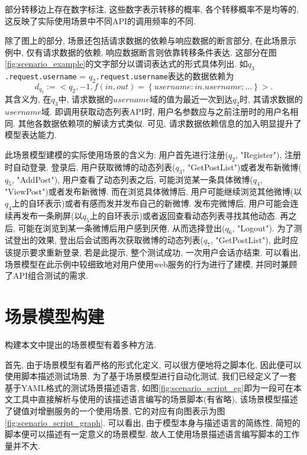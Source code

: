         部分转移边上存在数字标注, 这些数字表示转移的概率, 各个转移概率不是均等的, 这反映了实际使用场景中不同API的调用频率的不同.
        
        除了图上的部分, 场景还包括请求数据的依赖与响应数据的断言部分, 在此场景示例中, 仅有请求数据的依赖, 响应数据断言则依靠转移条件表达. 这部分在图\ref{fig:scenario_example}的文字部分以谓词表达式的形式具体列出. 如$q_3$\texttt{.request.username} = $q_2$\texttt{.request.username}表达的数据依赖为
        \begin{equation}
            d_{q_3} := <q_2, -1, f(in, out) = \left\{username: in.username;\dots\right\}>.
        \end{equation}
        其含义为, 在$q_3$中, 请求数据的$username$域的值为最近一次到达$q_2$时, 其请求数据的$username$域. 即调用获取动态列表API时, 用户名参数应与之前注册时的用户名相同. 其他各数据依赖项的解读方式类似. 可见, 请求数据依赖信息的加入明显提升了模型表达能力.
        
        此场景模型建模的实际使用场景的含义为: 用户首先进行注册($q_2$, "Register"), 注册时自动登录. 登录后, 用户获取微博的动态列表($q_3$, "GetPostList")或者发布新微博($q_5$, "AddPost"), 用户查看了动态列表之后, 可能浏览某一条具体微博($q_4$, "ViewPost")或者发布新微博. 而在浏览具体微博后, 用户可能继续浏览其他微博(以$q_4$上的自环表示)或者有感而发并发布自己的新微博. 发布完微博后, 用户可能会连续再发布一条刷屏(以$q_5$上的自环表示)或者返回查看动态列表寻找其他动态. 再之后, 可能在浏览到某一条微博后用户感到厌倦, 从而选择登出($q_6$, "Logout"). 为了测试登出的效果, 登出后会试图再次获取微博的动态列表($q_7$, "GetPostList"), 此时应该提示要求重新登录, 若是此提示, 整个测试成功, 一次用户会话亦结束. 可以看出, 场景模型在此示例中较细致地对用户使用web服务的行为进行了建模, 并同时兼顾了API组合测试的需求.
    
    \section{场景模型构建}
        \label{sec:scenario_build}
    
        构建本文中提出的场景模型有着多种方法.
        
        首先, 由于场景模型有着严格的形式化定义, 可以很方便地将之脚本化, 因此便可以使用脚本描述测试场景. 为了基于场景模型进行自动化测试, 我们已经定义了一套基于YAML格式的测试场景描述语言, 如图\ref{fig:scenario_script_eg}即为一段可在本文工具中直接解析与使用的该描述语言编写的场景脚本(有省略), 该场景模型描述了键值对增删服务的一个使用场景, 它的对应有向图表示为图\ref{fig:scenario_script_graph}. 可以看出, 由于模型本身与描述语言的简练性, 简短的脚本便可以描述有一定意义的场景模型.  故人工使用场景描述语言编写脚本的工作量并不大.
        
